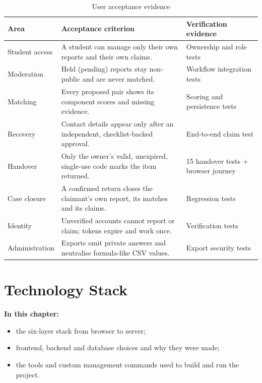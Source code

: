 \documentclass[12pt,a4paper,oneside]{report}
\begin{document}
\begin{table}[H]
\centering\small
\caption{User acceptance evidence}
\begin{tabularx}{\textwidth}{P{28mm}X P{33mm}}
\toprule
Area & Acceptance criterion & Verification evidence\\
\midrule
Student access & A student can manage only their own reports and their own claims. & Ownership and role tests\\
Moderation & Held (pending) reports stay non-public and are never matched. & Workflow integration tests\\
Matching & Every proposed pair shows its component scores and missing evidence. & Scoring and persistence tests\\
Recovery & Contact details appear only after an independent, checklist-backed approval. & End-to-end claim test\\
Handover & Only the owner's valid, unexpired, single-use code marks the item returned. & 15 handover tests + browser journey\\
Case closure & A confirmed return closes the claimant's own report, its matches and its claims. & Regression tests\\
Identity & Unverified accounts cannot report or claim; tokens expire and work once. & Verification tests\\
Administration & Exports omit private answers and neutralise formula-like CSV values. & Export security tests\\
\bottomrule
\end{tabularx}
\end{table}

\chapter{Technology Stack}
\textbf{In this chapter:}
\begin{itemize}[beginpenalty=10000]
  \item the six-layer stack from browser to server;
  \item frontend, backend and database choices and why they were made;
  \item the tools and custom management commands used to build and run the project.
\end{itemize}
\end{document}
